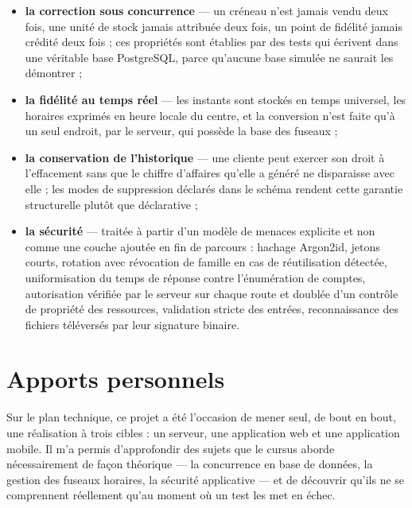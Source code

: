 \begin{itemize}[leftmargin=1.2cm]
  \item \textbf{la correction sous concurrence} --- un créneau n'est jamais
  vendu deux fois, une unité de stock jamais attribuée deux fois, un point de
  fidélité jamais crédité deux fois ; ces propriétés sont établies par des
  tests qui écrivent dans une véritable base PostgreSQL, parce qu'aucune base
  simulée ne saurait les démontrer ;

  \item \textbf{la fidélité au temps réel} --- les instants sont stockés en
  temps universel, les horaires exprimés en heure locale du centre, et la
  conversion n'est faite qu'à un seul endroit, par le serveur, qui possède la
  base des fuseaux ;

  \item \textbf{la conservation de l'historique} --- une cliente peut exercer
  son droit à l'effacement sans que le chiffre d'affaires qu'elle a généré ne
  disparaisse avec elle ; les modes de suppression déclarés dans le schéma
  rendent cette garantie structurelle plutôt que déclarative ;

  \item \textbf{la sécurité} --- traitée à partir d'un modèle de menaces
  explicite et non comme une couche ajoutée en fin de parcours : hachage
  Argon2id, jetons courts, rotation avec révocation de famille en cas de
  réutilisation détectée, uniformisation du temps de réponse contre
  l'énumération de comptes, autorisation vérifiée par le serveur sur chaque
  route et doublée d'un contrôle de propriété des ressources, validation
  stricte des entrées, reconnaissance des fichiers téléversés par leur
  signature binaire.
\end{itemize}

\section*{Apports personnels}

Sur le plan technique, ce projet a été l'occasion de mener seul, de bout en
bout, une réalisation à trois cibles : un serveur, une application web et une
application mobile. Il m'a permis d'approfondir des sujets que le cursus
aborde nécessairement de façon théorique --- la concurrence en base de données,
la gestion des fuseaux horaires, la sécurité applicative --- et de découvrir
qu'ils ne se comprennent réellement qu'au moment où un test les met en échec.

